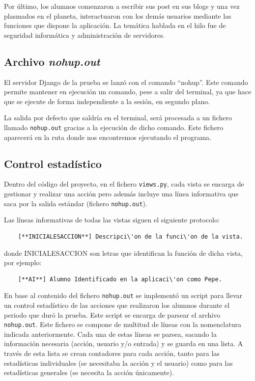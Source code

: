 \documentclass[a4paper, 12pt]{book}
\begin{document}
Por \'ultimo, los alumnos comenzaron a escribir sus post en sus blogs y una vez plasmados en el planeta, interactuaron con los dem\'as usuarios mediante las funciones 
que dispone la aplicaci\'on. La tem\'atica hablada en el hilo fue de seguridad inform\'atica y administraci\'on de servidores.


\subsection{Archivo \textit{nohup.out}}
\label{subseccion:archivonohup}
El servidor Django de la prueba se lanz\'o con el comando ``nohup''. Este comando permite mantener en ejecuci\'on un comando, pese a salir del terminal, ya que hace que 
se ejecute de forma independiente a la sesi\'on, en segundo plano.

La salida por defecto que saldr\'ia en el terminal, ser\'a procesada a un fichero llamado \texttt{nohup.out} gracias a la ejecuci\'on de dicho comando. Este fichero 
aparecer\'a en la ruta donde nos encontremos ejecutando el programa. 


\subsection{Control estad\'istico}
\label{subseccion:controlestadistico}
Dentro del c\'odigo del proyecto, en el fichero \texttt{views.py}, cada vista se encarga de gestionar y realizar una acci\'on pero adem\'as incluye una l\'inea 
informativa que saca por la salida est\'andar (fichero \texttt{nohup.out}).

Las l\'ineas informativas de todas las vistas siguen el siguiente protocolo:
    {\footnotesize\begin{verbatim}
    [**INICIALESACCION**] Descripci\'on de la funci\'on de la vista.
    \end{verbatim}}

donde INICIALESACCION son letras que identifican la funci\'on de dicha vista, por ejemplo:
    {\footnotesize\begin{verbatim}
    [**AI**] Alumno Identificado en la aplicaci\'on como Pepe.
    \end{verbatim}}
En base al contenido del fichero \texttt{nohup.out} se implement\'o un script para llevar un control estad\'istico de las acciones que realizaron los alumnos durante el 
periodo que dur\'o la prueba. Este script se encarga de parsear el archivo \texttt{nohup.out}. Este fichero se compone de multitud de l\'ineas con la nomenclatura indicada
anteriormente. Cada una de estas l\'ineas se parsea, sacando la informaci\'on necesaria (acci\'on, usuario y/o entrada) y se guarda en una lista. A trav\'es de esta 
lista se crean contadores para cada acci\'on, tanto para las estad\'isticas individuales (se necesitaba la acci\'on y el usuario) como para las estad\'isticas generales 
(se necesita la acci\'on \'unicamente). 
\end{document}
